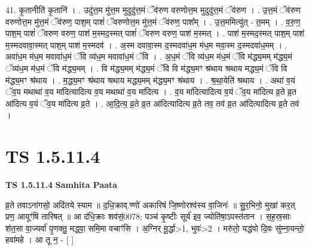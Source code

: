 \documentclass[17pt]{extarticle}
\begin{document}
41. कृ॒तानीति॑ कृ॒तानि॑ । . उदु॑त्त॒म मु॑त्त॒म मुदुदु॑त्त॒मं ॅव॑रुण वरुणोत्त॒म मुदुदु॑त्त॒मं ॅव॑रुण । . उ॒त्त॒मं ॅव॑रुण वरुणोत्त॒म मु॑त्त॒मं ॅव॑रुण॒ पाश॒म् पाशं॑ ॅवरुणोत्त॒म मु॑त्त॒मं ॅव॑रुण॒ पाश᳚म् । . उ॒त्त॒ममित्यु॑त् - त॒मम् । . व॒रु॒ण॒ पाश॒म् पाशं॑ ॅवरुण वरुण॒ पाश॑ म॒स्मद॒स्मत् पाशं॑ ॅवरुण वरुण॒ पाश॑ म॒स्मत् । . पाश॑ म॒स्मद॒स्मत् पाश॒म् पाश॑ म॒स्मदवावा॒स्मत् पाश॒म् पाश॑ म॒स्मदव॑ । . अ॒स्म दवावा॒स्म द॒स्मदवा॑ध॒म म॑ध॒म मवा॒स्म द॒स्मदवा॑ध॒मम् । . अवा॑ध॒म म॑ध॒म मवावा॑ध॒मं ॅवि व्य॑ध॒म मवावा॑ध॒मं ॅवि । . अ॒ध॒मं ॅवि व्य॑ध॒म म॑ध॒मं ॅवि म॑द्ध्य॒मम् म॑द्ध्य॒मं ॅव्य॑ध॒म म॑ध॒मं ॅवि म॑द्ध्य॒मम् । . वि म॑द्ध्य॒मम् म॑द्ध्य॒मं ॅवि वि म॑द्ध्य॒मꣳ श्र॑थाय श्रथाय मद्ध्य॒मं ॅवि वि म॑द्ध्य॒मꣳ श्र॑थाय । . म॒द्ध्य॒मꣳ श्र॑थाय श्रथाय मद्ध्य॒मम् म॑द्ध्य॒मꣳ श्र॑थाय । . श्र॒था॒येति॑ श्रथाय । . अथा॑ व॒यं ॅव॒य मथाथा॑ व॒य मा॑दित्यादित्य व॒य मथाथा॑ व॒य मा॑दित्य । . व॒य मा॑दित्यादित्य व॒यं ॅव॒य मा॑दित्य व्र॒ते व्र॒त आ॑दित्य व॒यं ॅव॒य मा॑दित्य व्र॒ते । . आ॒दि॒त्य॒ व्र॒ते व्र॒त आ॑दित्यादित्य व्र॒ते तव॒ तव॑ व्र॒त आ॑दित्यादित्य व्र॒ते तव॑ । \newline
\pagebreak
{}
\section*{ TS 1.5.11.4 }

\textbf{TS 1.5.11.4 } \newline
\textbf{Samhita Paata} \newline

व्र॒ते तवाऽना॑गसो॒ अदि॑तये स्याम ॥ द॒धि॒क्राव्.ण्णो॑ अकारिषं जि॒ष्णोरश्व॑स्य वा॒जिनः॑ ॥ सु॒र॒भिनो॒ मुखा॑ कर॒त् प्रण॒ आयूꣳ॑षि तारिषत् ॥ आ द॑धि॒क्राः शव॑स॒॑0078; पञ्च॑ कृ॒ष्टीः सूर्य॑ इव॒ ज्योति॑षा॒ऽपस्त॑तान । स॒ह॒स्र॒साः श॑त॒सा वा॒ज्यर्वा॑ पृ॒णक्तु॒ मद्ध्वा॒ समि॒मा वचाꣳ॑सि । अ॒ग्निर् मू॒र्द्धा>1, भुवः॑>2 । मरु॑तो॒ यद्ध॑वो दि॒वः सु॑म्ना॒यन्तो॒ हवा॑महे । आ तू न॒ - [ ] \newline
\end{document}
